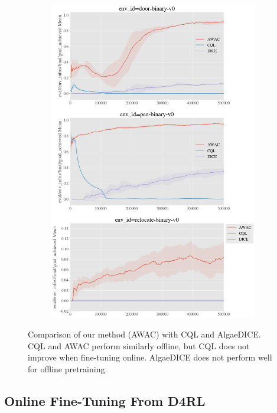 \begin{figure}[H]
\begin{subfigure}[b]{0.49\textwidth}
    \end{subfigure}
    \begin{subfigure}[b]{0.49\textwidth}
        \center
        \includegraphics[width=\textwidth]{awac/figures/iclrrebuttal/d4rl_hand_comparisons.png}
    \end{subfigure}
    \caption{Comparison of our method (AWAC) with CQL and AlgaeDICE. CQL and AWAC perform similarly offline, but CQL does not improve when fine-tuning online. AlgaeDICE does not perform well for offline pretraining. }
    \label{fig:cql-dice}
\end{figure}


\subsection{Online Fine-Tuning From D4RL}

